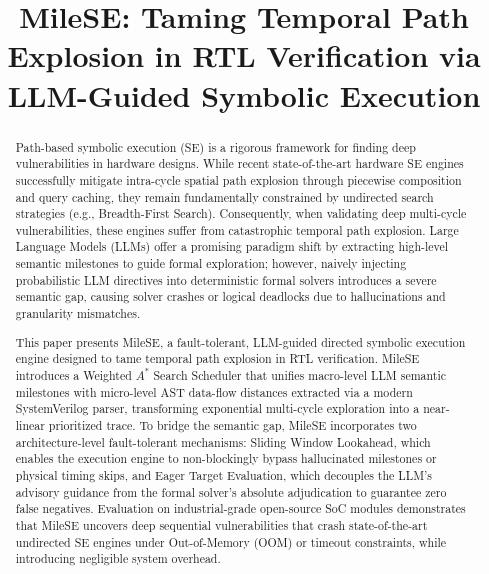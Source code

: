 \documentclass[conference]{IEEEtran}
\begin{document}
\title{MileSE: Taming Temporal Path Explosion in RTL Verification via LLM-Guided Symbolic Execution}

\author{
}

\maketitle

\begin{abstract}
Path-based symbolic execution (SE) is a rigorous framework for finding deep vulnerabilities in hardware designs. While recent state-of-the-art hardware SE engines successfully mitigate intra-cycle spatial path explosion through piecewise composition and query caching, they remain fundamentally constrained by undirected search strategies (e.g., Breadth-First Search). Consequently, when validating deep multi-cycle vulnerabilities, these engines suffer from catastrophic temporal path explosion. Large Language Models (LLMs) offer a promising paradigm shift by extracting high-level semantic milestones to guide formal exploration; however, naively injecting probabilistic LLM directives into deterministic formal solvers introduces a severe semantic gap, causing solver crashes or logical deadlocks due to hallucinations and granularity mismatches.

This paper presents MileSE, a fault-tolerant, LLM-guided directed symbolic execution engine designed to tame temporal path explosion in RTL verification. MileSE introduces a Weighted $A^*$ Search Scheduler that unifies macro-level LLM semantic milestones with micro-level AST data-flow distances extracted via a modern SystemVerilog parser, transforming exponential multi-cycle exploration into a near-linear prioritized trace. To bridge the semantic gap, MileSE incorporates two architecture-level fault-tolerant mechanisms: Sliding Window Lookahead, which enables the execution engine to non-blockingly bypass hallucinated milestones or physical timing skips, and Eager Target Evaluation, which decouples the LLM's advisory guidance from the formal solver's absolute adjudication to guarantee zero false negatives. Evaluation on industrial-grade open-source SoC modules demonstrates that MileSE uncovers deep sequential vulnerabilities that crash state-of-the-art undirected SE engines under Out-of-Memory (OOM) or timeout constraints, while introducing negligible system overhead.
\end{abstract}
\end{document}

